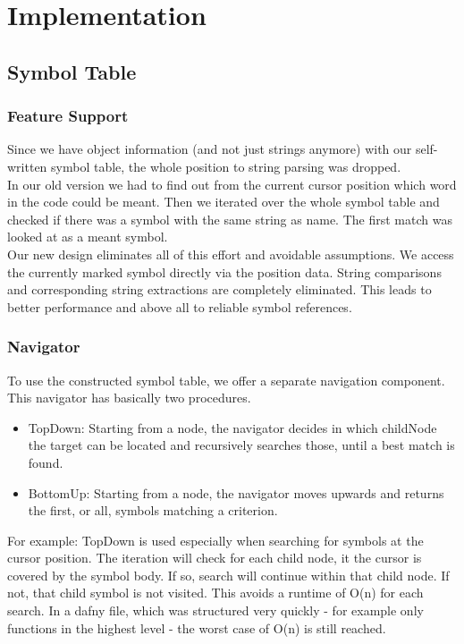 \section{Implementation}

\subsection{Symbol Table}



\subsubsection{Feature Support}
Since we have object information (and not just strings anymore) with our self-written symbol table,
the whole position to string parsing was dropped. \\

In our old version we had to find out from the current cursor position which word in the code could be meant.
Then we iterated over the whole symbol table and checked if there was a symbol with the same string as name.
The first match was looked at as a meant symbol. \\

Our new design eliminates all of this effort and avoidable assumptions.
We access the currently marked symbol directly via the position data.
String comparisons and corresponding string extractions are completely eliminated.
This leads to better performance and above all to reliable symbol references.


\subsubsection{Navigator}
To use the constructed symbol table, we offer a separate navigation component.
This navigator has basically two procedures.
\begin{itemize}
\item TopDown: Starting from a node, the navigator decides in which childNode the target can be located and recursively searches those, until a best match is found.
\item BottomUp: Starting from a node, the navigator moves upwards and returns the first, or all, symbols matching a criterion.
\end{itemize}

For example: TopDown is used especially when searching for symbols at the cursor position.
The iteration will check for each child node, it the cursor is covered by the symbol body.
If so, search will continue within that child node.
If not, that child symbol is not visited.
This avoids a runtime of O(n) for each search. 
In a dafny file, which was structured very quickly - for example only functions in the highest level - the worst case of O(n) is still reached. 


